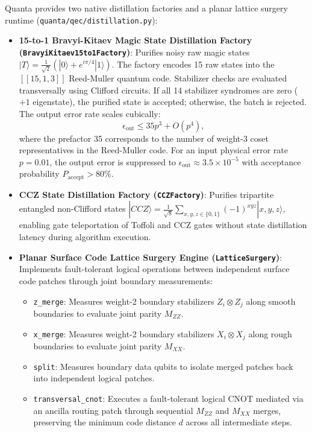 \documentclass[aps,prx,twocolumn,superscriptaddress,nofootinbib]{revtex4-2}
\newcommand{\ket}[1]{|#1\rangle}
\begin{document}
Quanta provides two native distillation factories and a planar lattice surgery runtime (\texttt{quanta/qec/distillation.py}):
\begin{itemize}
    \item \textbf{15-to-1 Bravyi-Kitaev Magic State Distillation Factory (\texttt{BravyiKitaev15to1Factory})}: Purifies noisy raw magic states $\ket{T} = \frac{1}{\sqrt{2}}(\ket{0} + e^{i\pi/4}\ket{1})$. The factory encodes 15 raw states into the $[[15, 1, 3]]$ Reed-Muller quantum code. Stabilizer checks are evaluated transversally using Clifford circuits. If all 14 stabilizer syndromes are zero ($+1$ eigenstate), the purified state is accepted; otherwise, the batch is rejected. The output error rate scales cubically:
    \begin{equation}
        \epsilon_{\text{out}} \le 35 p^3 + O(p^4),
    \end{equation}
    where the prefactor 35 corresponds to the number of weight-3 coset representatives in the Reed-Muller code. For an input physical error rate $p = 0.01$, the output error is suppressed to $\epsilon_{\text{out}} \approx 3.5 \times 10^{-5}$ with acceptance probability $P_{\text{accept}} > 80\%$.
    \item \textbf{CCZ State Distillation Factory (\texttt{CCZFactory})}: Purifies tripartite entangled non-Clifford states $\ket{CCZ} = \frac{1}{\sqrt{8}} \sum_{x,y,z \in \{0, 1\}} (-1)^{xyz} \ket{x, y, z}$, enabling gate teleportation of Toffoli and CCZ gates without state distillation latency during algorithm execution.
    \item \textbf{Planar Surface Code Lattice Surgery Engine (\texttt{LatticeSurgery})}: Implements fault-tolerant logical operations between independent surface code patches through joint boundary measurements:
    \begin{itemize}
        \item \texttt{z\_merge}: Measures weight-2 boundary stabilizers $Z_i \otimes Z_j$ along smooth boundaries to evaluate joint parity $M_{ZZ}$.
        \item \texttt{x\_merge}: Measures weight-2 boundary stabilizers $X_i \otimes X_j$ along rough boundaries to evaluate joint parity $M_{XX}$.
        \item \texttt{split}: Measures boundary data qubits to isolate merged patches back into independent logical patches.
        \item \texttt{transversal\_cnot}: Executes a fault-tolerant logical CNOT mediated via an ancilla routing patch through sequential $M_{ZZ}$ and $M_{XX}$ merges, preserving the minimum code distance $d$ across all intermediate steps.
    \end{itemize}
\end{itemize}
\end{document}
